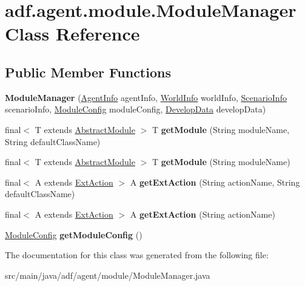 \hypertarget{classadf_1_1agent_1_1module_1_1ModuleManager}{}\section{adf.\+agent.\+module.\+Module\+Manager Class Reference}
\label{classadf_1_1agent_1_1module_1_1ModuleManager}
\subsection*{Public Member Functions}
\begin{DoxyCompactItemize}
\item 
\hypertarget{classadf_1_1agent_1_1module_1_1ModuleManager_ac16f2c9e14069d9b77054a12e5b58b15}{}\label{classadf_1_1agent_1_1module_1_1ModuleManager_ac16f2c9e14069d9b77054a12e5b58b15} 
{\bfseries Module\+Manager} (\hyperlink{classadf_1_1agent_1_1info_1_1AgentInfo}{Agent\+Info} agent\+Info, \hyperlink{classadf_1_1agent_1_1info_1_1WorldInfo}{World\+Info} world\+Info, \hyperlink{classadf_1_1agent_1_1info_1_1ScenarioInfo}{Scenario\+Info} scenario\+Info, \hyperlink{classadf_1_1agent_1_1config_1_1ModuleConfig}{Module\+Config} module\+Config, \hyperlink{classadf_1_1agent_1_1develop_1_1DevelopData}{Develop\+Data} develop\+Data)
\item 
\hypertarget{classadf_1_1agent_1_1module_1_1ModuleManager_a53d335af22bbe454bd59eab127e5f0d0}{}\label{classadf_1_1agent_1_1module_1_1ModuleManager_a53d335af22bbe454bd59eab127e5f0d0} 
final$<$ T extends \hyperlink{classadf_1_1component_1_1module_1_1AbstractModule}{Abstract\+Module} $>$ T {\bfseries get\+Module} (String module\+Name, String default\+Class\+Name)
\item 
\hypertarget{classadf_1_1agent_1_1module_1_1ModuleManager_a97f961775277112b300c281b55b2571f}{}\label{classadf_1_1agent_1_1module_1_1ModuleManager_a97f961775277112b300c281b55b2571f} 
final$<$ T extends \hyperlink{classadf_1_1component_1_1module_1_1AbstractModule}{Abstract\+Module} $>$ T {\bfseries get\+Module} (String module\+Name)
\item 
\hypertarget{classadf_1_1agent_1_1module_1_1ModuleManager_aac7c21a99087d5b2c48aa911193c3c14}{}\label{classadf_1_1agent_1_1module_1_1ModuleManager_aac7c21a99087d5b2c48aa911193c3c14} 
final$<$ A extends \hyperlink{classadf_1_1component_1_1extaction_1_1ExtAction}{Ext\+Action} $>$ A {\bfseries get\+Ext\+Action} (String action\+Name, String default\+Class\+Name)
\item 
\hypertarget{classadf_1_1agent_1_1module_1_1ModuleManager_a48a8feb81aaa7919db45ead57662c621}{}\label{classadf_1_1agent_1_1module_1_1ModuleManager_a48a8feb81aaa7919db45ead57662c621} 
final$<$ A extends \hyperlink{classadf_1_1component_1_1extaction_1_1ExtAction}{Ext\+Action} $>$ A {\bfseries get\+Ext\+Action} (String action\+Name)
\item 
\hypertarget{classadf_1_1agent_1_1module_1_1ModuleManager_aea388134b8a03bf6237eb5874da9e095}{}\label{classadf_1_1agent_1_1module_1_1ModuleManager_aea388134b8a03bf6237eb5874da9e095} 
\hyperlink{classadf_1_1agent_1_1config_1_1ModuleConfig}{Module\+Config} {\bfseries get\+Module\+Config} ()
\end{DoxyCompactItemize}


The documentation for this class was generated from the following file\+:\begin{DoxyCompactItemize}
\item 
src/main/java/adf/agent/module/Module\+Manager.\+java\end{DoxyCompactItemize}

